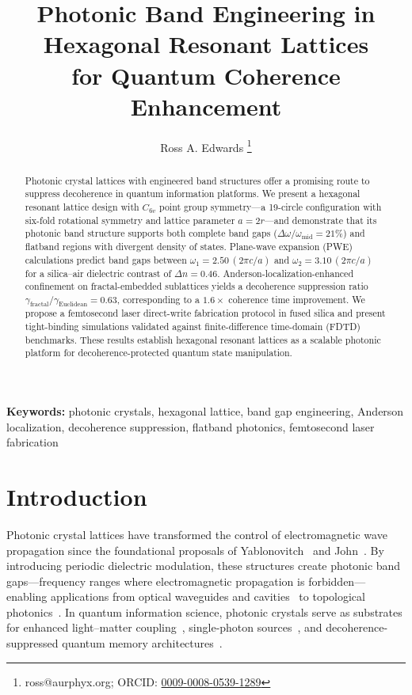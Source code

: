 \documentclass[10pt,letterpaper]{article}
\title{Photonic Band Engineering in Hexagonal Resonant Lattices\\
for Quantum Coherence Enhancement}
\author[1]{Ross A. Edwards \orcidlink{0009-0008-0539-1289}\thanks{ross@aurphyx.org; ORCID: \href{https://orcid.org/0009-0008-0539-1289}{0009-0008-0539-1289}}}
\affil[1]{Aurphyx LLC, Erie, Pennsylvania 16501, USA}
\date{}
\begin{document}
\begin{abstract}
Photonic crystal lattices with engineered band structures offer a promising route to suppress decoherence in quantum information platforms. We present a hexagonal resonant lattice design with $C_{6v}$ point group symmetry---a 19-circle configuration with six-fold rotational symmetry and lattice parameter $a = 2r$---and demonstrate that its photonic band structure supports both complete band gaps ($\Delta\omega/\omega_\mathrm{mid} = 21\%$) and flatband regions with divergent density of states. Plane-wave expansion (PWE) calculations predict band gaps between $\omega_1 = 2.50\,(2\pi c/a)$ and $\omega_2 = 3.10\,(2\pi c/a)$ for a silica--air dielectric contrast of $\Delta n = 0.46$. Anderson-localization-enhanced confinement on fractal-embedded sublattices yields a decoherence suppression ratio $\gamma_\mathrm{fractal}/\gamma_\mathrm{Euclidean} = 0.63$, corresponding to a $1.6\times$ coherence time improvement. We propose a femtosecond laser direct-write fabrication protocol in fused silica and present tight-binding simulations validated against finite-difference time-domain (FDTD) benchmarks. These results establish hexagonal resonant lattices as a scalable photonic platform for decoherence-protected quantum state manipulation.
\end{abstract}

\maketitle

\noindent\textbf{Keywords:} photonic crystals, hexagonal lattice, band gap engineering, Anderson localization, decoherence suppression, flatband photonics, femtosecond laser fabrication


\section{Introduction}
\label{sec:introduction}

Photonic crystal lattices have transformed the control of electromagnetic wave propagation since the foundational proposals of Yablonovitch~\cite{Yablonovitch1987} and John~\cite{John1987}. By introducing periodic dielectric modulation, these structures create photonic band gaps---frequency ranges where electromagnetic propagation is forbidden---enabling applications from optical waveguides and cavities~\cite{Joannopoulos2008} to topological photonics~\cite{Ozawa2019,Haldane2008}. In quantum information science, photonic crystals serve as substrates for enhanced light--matter coupling~\cite{Aspuru2012}, single-photon sources~\cite{Aharonovich2016}, and decoherence-suppressed quantum memory architectures~\cite{Childress2006}.
\end{document}
